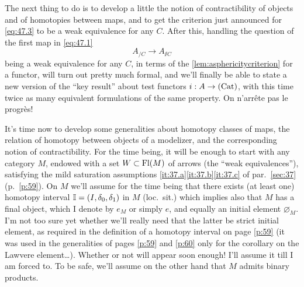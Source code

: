 The next thing to do is to develop a little the notion of
contractibility of objects and of homotopies between maps, and to get
the criterion just announced for \eqref{eq:47.3} to be a weak
equivalence for any $C$. After this, handling the question of the
first map in \eqref{eq:47.1}
\begin{equation}
  \label{eq:47.4}
  A_{/C} \to A_{\sslash C}
  \tag{4}
\end{equation}
being a weak equivalence for any $C$, in terms of the
\ref{lem:asphericitycriterion} for a functor, will turn out pretty
much formal, and we'll finally be able to state a new version of the
``key result'' about test functors $i:A\to{\ensuremath{(\mathrm{Cat})}}$, with this time twice
as many equivalent formulations of the same property. On n'arr\^ete
pas le progr\`es!

\bigbreak
\noindent\hfill{}\par

\label{sec:48}%
It's time now to develop some generalities about homotopy classes of
maps, the relation of homotopy between objects of a modelizer, and the
corresponding notion of contractibility. For the time being, it will
be enough to start with any category $M$, endowed with a set
$W\subset\operatorname{Fl}(M)$ of arrows (the ``weak equivalences''), satisfying the
mild saturation assumptions \ref{it:37.a}\ref{it:37.b}\ref{it:37.c} of
par.\ \ref{sec:37} (p.\ \ref{p:59}). On $M$ we'll assume for the time
being that there exists (at least one) homotopy interval
${\mathbb{I}} = (I,\delta_0,\delta_1)$ in $M$ (loc.\ sit.) which implies also
that $M$ has a final object, which I denote by $e_M$ or simply $e$,
and equally an initial element $\varnothing_M$. I'm not too sure yet
whether we'll really need that the latter be strict initial element,
as required in the definition of a homotopy interval on page
\ref{p:59} (it was used in the generalities of pages \ref{p:59} and
\ref{p:60} only for the corollary on the Lawvere
element\ldots). Whether or not will appear soon enough! I'll assume it
till I am forced to. To be safe, we'll assume on the other hand that
$M$ admits binary products.

